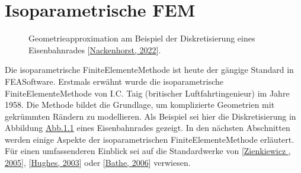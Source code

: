 \documentclass[letterpaper,10pt,german]{jupyterBook}
\let\sphinxpxdimen\pdfpxdimen\else\newdimen\sphinxpxdimen
\begin{document}
\sphinxstepscope


\chapter{Isoparametrische FEM}
\label{\detokenize{chapters/chapter3/isoparametrischeFEM:isoparametrische-fem}}\label{\detokenize{chapters/chapter3/isoparametrischeFEM::doc}}
\begin{figure}[htbp]
\centering
\capstart

\noindent\sphinxincludegraphics[width=600\sphinxpxdimen]{{Nackenhorst_01}.png}
\caption{Geometrieapproximation am Beispiel der Diskretisierung eines Eisenbahnrades {[}\hyperlink{cite.quellen:id17}{Nackenhorst, 2022}{]}.}\label{\detokenize{chapters/chapter3/isoparametrischeFEM:isogeom}}\end{figure}

\sphinxAtStartPar
Die isoparametrische Finite\sphinxhyphen{}Elemente\sphinxhyphen{}Methode ist heute der gängige Standard in FEA\sphinxhyphen{}Software. Erstmals erwähnt wurde die isoparametrische Finite\sphinxhyphen{}Elemente\sphinxhyphen{}Methode von I.C. Taig (britischer Luftfahrtingenieur) im Jahre 1958. Die Methode bildet die Grundlage, um komplizierte Geometrien mit gekrümmten Rändern zu modellieren. Als Beispiel sei hier die Diskretisierung in Abbildung \hyperref[\detokenize{chapters/chapter3/isoparametrischeFEM:isogeom}]{Abb.\@ \ref{\detokenize{chapters/chapter3/isoparametrischeFEM:isogeom}}} eines Eisenbahnrades gezeigt. In den nächsten Abschnitten werden einige Aspekte der isoparametrischen Finite\sphinxhyphen{}Elemente\sphinxhyphen{}Methode erläutert. Für einen umfassenderen Einblick sei auf die Standardwerke von {[}\hyperlink{cite.quellen:id3}{Zienkiewicz , 2005}{]}, {[}\hyperlink{cite.quellen:id18}{Hughes, 2003}{]} oder {[}\hyperlink{cite.quellen:id19}{Bathe, 2006}{]} verwiesen.
\end{document}
